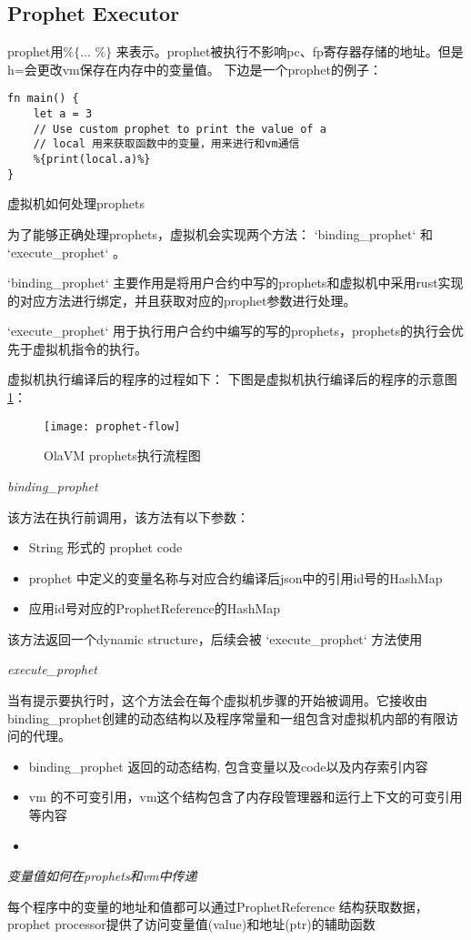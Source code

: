 \subsection{Prophet Executor}\label{subsec: processor-prophet-executor}
prophet用$\texttt{\%\{ ... \%\}}$ 来表示。prophet被执行不影响pc、fp寄存器存储的地址。但是h=会更改vm保存在内存中的变量值。
下边是一个prophet的例子：
\begin{lstlisting}[label={lst:prophet-demo}]
fn main() {
    let a = 3
    // Use custom prophet to print the value of a
    // local 用来获取函数中的变量，用来进行和vm通信
    %{print(local.a)%}
}
\end{lstlisting}

虚拟机如何处理prophets

为了能够正确处理prophets，虚拟机会实现两个方法： `binding\_prophet` 和 `execute\_prophet` 。

`binding\_prophet` 主要作用是将用户合约中写的prophets和虚拟机中采用rust实现的对应方法进行绑定，并且获取对应的prophet参数进行处理。

`execute\_prophet` 用于执行用户合约中编写的写的prophets，prophets的执行会优先于虚拟机指令的执行。

虚拟机执行编译后的程序的过程如下：
下图是虚拟机执行编译后的程序的示意图\ref{fig: prophet-flow}：
\begin{figure}[!htp]
    \centering
    \texttt{[image: prophet-flow]}
    \caption{OlaVM prophets执行流程图}
    \label{fig: prophet-flow}
\end{figure}

\emph{binding\_prophet}

该方法在执行前调用，该方法有以下参数：

\begin{itemize}
    \item String 形式的  prophet code
    \item prophet 中定义的变量名称与对应合约编译后json中的引用id号的HashMap
    \item 应用id号对应的ProphetReference的HashMap
\end{itemize}

该方法返回一个dynamic structure，后续会被 `execute\_prophet` 方法使用

\emph{execute\_prophet}

当有提示要执行时，这个方法会在每个虚拟机步骤的开始被调用。它接收由binding\_prophet创建的动态结构以及程序常量和一组包含对虚拟机内部的有限访问的代理。

\begin{itemize}
    \item binding\_prophet 返回的动态结构, 包含变量以及code以及内存索引内容
    \item vm 的不可变引用，vm这个结构包含了内存段管理器和运行上下文的可变引用等内容
\item \end{itemize}

\emph{变量值如何在prophets和vm中传递}

每个程序中的变量的地址和值都可以通过ProphetReference 结构获取数据，prophet processor提供了访问变量值(value)和地址(ptr)的辅助函数